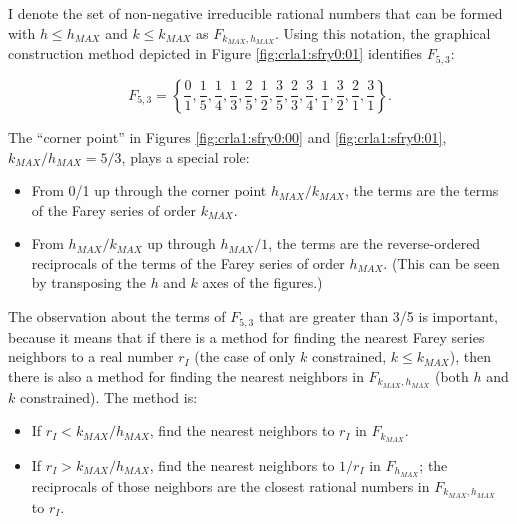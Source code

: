 I denote the set of non-negative irreducible rational numbers that can be formed
with $h \leq h_{MAX}$ and $k \leq k_{MAX}$ as $F_{k_{MAX}, h_{MAX}}$\@.
Using this notation, the graphical construction method
depicted in Figure \ref{fig:crla1:sfry0:01} identifies $F_{5,3}$:

\begin{equation}
\label{eq:crla1:sfry0:eq0002a}
F_{5,3}  = \left\{ {\frac{0}{1},\frac{1}{5},\frac{1}{4},
                    \frac{1}{3},\frac{2}{5},\frac{1}{2},
                    \frac{3}{5},\frac{2}{3},\frac{3}{4},
                    \frac{1}{1},\frac{3}{2},\frac{2}{1},
                    \frac{3}{1}} \right\} .
\end{equation}


The ``corner point'' in Figures \ref{fig:crla1:sfry0:00}
and \ref{fig:crla1:sfry0:01}, $k_{MAX}/h_{MAX} = 5/3$, plays a special role:

\begin{itemize}
\item From 0/1 up through the corner point $h_{MAX}/k_{MAX}$,
      the terms are the terms of the Farey series of order
      $k_{MAX}$.
\item From $h_{MAX}/k_{MAX}$ up through $h_{MAX}/1$, the terms
      are the reverse-ordered reciprocals of the terms of the
      Farey series of order $h_{MAX}$\@. (This can be seen
      by transposing the $h$ and $k$ axes of the figures.)
\end{itemize}

The observation about the terms of $F_{5,3}$ that are greater than 3/5 is
important, because it means that if there is a method for finding the
nearest Farey series neighbors to a real number $r_I$ (the case of
only $k$ constrained, $k \leq k_{MAX}$), then there is also a method for finding
the nearest neighbors in $F_{k_{MAX}, h_{MAX}}$ (both $h$ and $k$ constrained).
The method is:

\begin{itemize}
\item If $r_I < k_{MAX}/h_{MAX}$, find the nearest neighbors to $r_I$ in
      $F_{k_{MAX}}$.
\item If $r_I > k_{MAX}/h_{MAX}$, find the nearest neighbors to $1/r_I$
      in $F_{h_{MAX}}$; the reciprocals of those neighbors are the closest
      rational numbers in $F_{k_{MAX}, h_{MAX}}$ to $r_I$.
\end{itemize}

